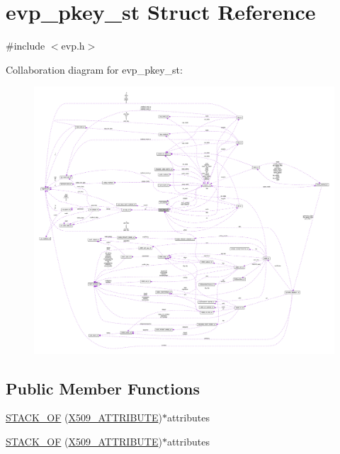\hypertarget{structevp__pkey__st}{}\section{evp\+\_\+pkey\+\_\+st Struct Reference}
\label{structevp__pkey__st}


{\ttfamily \#include $<$evp.\+h$>$}



Collaboration diagram for evp\+\_\+pkey\+\_\+st\+:\nopagebreak
\begin{figure}[H]
\begin{center}
\leavevmode
\includegraphics[width=350pt]{structevp__pkey__st__coll__graph}
\end{center}
\end{figure}
\subsection*{Public Member Functions}
\begin{DoxyCompactItemize}
\item 
\hyperlink{structevp__pkey__st_a68a742d5b82cbd7ef7e8fbbedbca6dc5}{S\+T\+A\+C\+K\+\_\+\+OF} (\hyperlink{crypto_2x509_2x509_8h_aa4f1a62a9d2dd8cb6780fe2713737c0f}{X509\+\_\+\+A\+T\+T\+R\+I\+B\+U\+TE})$\ast$attributes
\item 
\hyperlink{structevp__pkey__st_a68a742d5b82cbd7ef7e8fbbedbca6dc5}{S\+T\+A\+C\+K\+\_\+\+OF} (\hyperlink{crypto_2x509_2x509_8h_aa4f1a62a9d2dd8cb6780fe2713737c0f}{X509\+\_\+\+A\+T\+T\+R\+I\+B\+U\+TE})$\ast$attributes
\end{DoxyCompactItemize}
